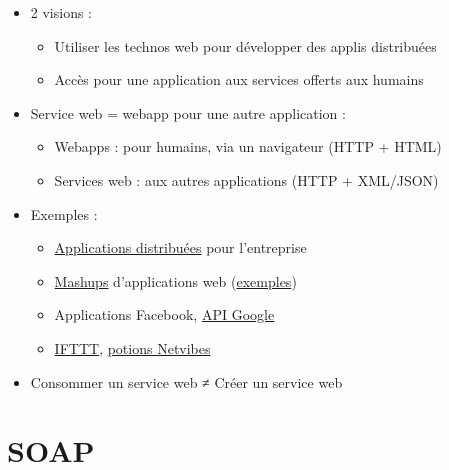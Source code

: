 \begin{itemize}
\tightlist
\item
  2 visions :

  \begin{itemize}
  \tightlist
  \item
    Utiliser les technos web pour développer des applis distribuées
  \item
    Accès pour une application aux services offerts aux humains
  \end{itemize}
\item
  Service web = webapp pour une autre application :

  \begin{itemize}
  \tightlist
  \item
    Webapps : pour humains, via un navigateur (HTTP + HTML)
  \item
    Services web : aux autres applications (HTTP + XML/JSON)
  \end{itemize}
\item
  Exemples :

  \begin{itemize}
  \tightlist
  \item
    \href{https://upload.wikimedia.org/wikipedia/commons/3/3f/Concept_WS.jpg}{Applications
    distribuées} pour l'entreprise
  \item
    \href{https://fr.wikipedia.org/wiki/Application_composite}{Mashups}
    d'applications web
    (\href{https://www.programmableweb.com/category/mashups}{exemples})
  \item
    Applications Facebook,
    \href{https://developers.google.com/apis-explorer/}{API Google}
  \item
    \href{https://ifttt.com/}{IFTTT},
    \href{https://www.netvibes.com/fr/explorer/dashboard-of-things}{potions
    Netvibes}
  \end{itemize}
\item
  Consommer un service web ≠ Créer un service web
\end{itemize}

\hypertarget{soap}{%
\section{SOAP}\label{soap}}

